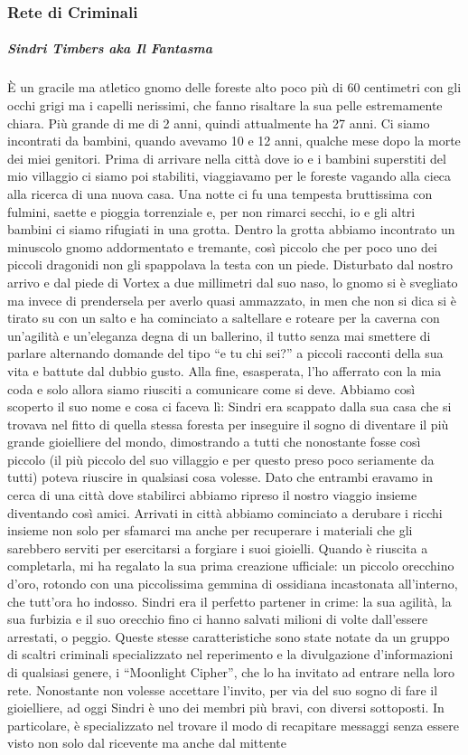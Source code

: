 \documentclass{article}
\begin{document}
\subsubsection{Rete di Criminali}
\subparagraph{Sindri Timbers aka Il Fantasma}
È un gracile ma atletico gnomo delle foreste alto poco più di 60 centimetri con gli occhi grigi ma i capelli nerissimi, che fanno risaltare la sua pelle estremamente chiara. Più grande di me di 2 anni, quindi attualmente ha 27 anni. Ci siamo incontrati da bambini, quando avevamo 10 e 12 anni, qualche mese dopo la morte dei miei genitori. Prima di arrivare nella città dove io e i bambini superstiti del mio villaggio ci siamo poi stabiliti, viaggiavamo per le foreste vagando alla cieca alla ricerca di una nuova casa. Una notte ci fu una tempesta bruttissima con fulmini, saette e pioggia torrenziale e, per non rimarci secchi, io e gli altri bambini ci siamo rifugiati in una grotta. Dentro la grotta abbiamo incontrato un minuscolo gnomo addormentato e tremante, così piccolo che per poco uno dei piccoli dragonidi non gli spappolava la testa con un piede. Disturbato dal nostro arrivo e dal piede di Vortex a due millimetri dal suo naso, lo gnomo si è svegliato ma invece di prendersela per averlo quasi ammazzato, in men che non si dica si è tirato su con un salto e ha cominciato a saltellare e roteare per la caverna con un’agilità e un’eleganza degna di un ballerino, il tutto senza mai smettere di parlare alternando domande del tipo “e tu chi sei?” a piccoli racconti della sua vita e battute dal dubbio gusto. Alla fine, esasperata, l’ho afferrato con la mia coda e solo allora siamo riusciti a comunicare come si deve. Abbiamo così scoperto il suo nome e cosa ci faceva lì: Sindri era scappato dalla sua casa che si trovava nel fitto di quella stessa foresta per inseguire il sogno di diventare il più grande gioielliere del mondo, dimostrando a tutti che nonostante fosse così piccolo (il più piccolo del suo villaggio e per questo preso poco seriamente da tutti) poteva riuscire in qualsiasi cosa volesse. Dato che entrambi eravamo in cerca di una città dove stabilirci abbiamo ripreso il nostro viaggio insieme diventando così amici. Arrivati in città abbiamo cominciato a derubare i ricchi insieme non solo per sfamarci ma anche per recuperare i materiali che gli sarebbero serviti per esercitarsi a forgiare i suoi gioielli. Quando è riuscita a completarla, mi ha regalato la sua prima creazione ufficiale: un piccolo orecchino d’oro, rotondo con una piccolissima gemmina di ossidiana incastonata all’interno, che tutt’ora ho indosso. Sindri era il perfetto partener in crime: la sua agilità, la sua furbizia e il suo orecchio fino ci hanno salvati milioni di volte dall’essere arrestati, o peggio. Queste stesse caratteristiche sono state notate da un gruppo di scaltri criminali specializzato nel reperimento e la divulgazione d’informazioni di qualsiasi genere, i “Moonlight Cipher”, che lo ha invitato ad entrare nella loro rete. Nonostante non volesse accettare l’invito, per via del suo sogno di fare il gioielliere, ad oggi Sindri è uno dei membri più bravi, con diversi sottoposti. In particolare, è specializzato nel trovare il modo di recapitare messaggi senza essere visto non solo dal ricevente ma anche dal mittente 
\end{document}
